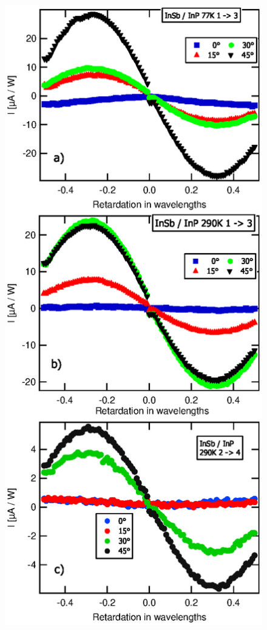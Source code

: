 \documentclass{article}
\begin{document}
\begin{figure}[htb]
\begin{center}
\includegraphics[scale=0.75]{fig6.eps}
\end{center}
\end{figure}
\end{document}
